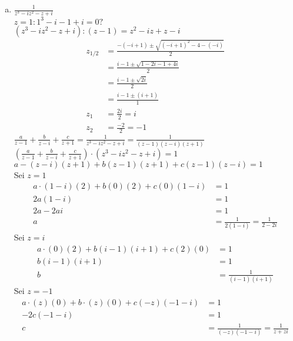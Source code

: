 \documentclass[11pt,a4paper]{article}
\begin{document}
    \begin{enumerate}[a)]
      \item $\frac{1}{z^3-iz^2-z+i}$\\
      $z=1:1^3-i-1+i=0?$\\
      $\left(z^3-iz^2-z+i\right):\left(z-1\right)=z^2-iz+z-i$
      \begin{align*}
        z_{1/2}&=\frac{-\left(-i+1\right)\pm\sqrt{\left(-i+1\right)^2-4-\left(-i\right)}}{2}\\
        &=\frac{i-1\pm\sqrt{1-2i-1+4i}}{2}\\
        &=\frac{i-1\pm\sqrt{2i}}{2}\\
        &=\frac{i-1\pm\left(i+1\right)}{1}\\
        z_1&=\frac{2i}{2}=i\\
        z_2&=\frac{-2}{2}=-1
      \end{align*}
      $\frac{a}{z-1}+\frac{b}{z-i}+\frac{c}{z+1}=\frac{1}{z^3-iz^2-z+i}=\frac{1}{\left(z-1\right)\left(z-i\right)\left(z+1\right)}$\\
      $\left(\frac{a}{z-1}+\frac{b}{z-i}+\frac{c}{z+1}\right)\cdot\left(z^3-iz^2-z+i\right)=1$\\
      $a-\left(z-i\right)\left(z+1\right)+b\left(z-1\right)\left(z+1\right)+c\left(z-1\right)\left(z-i\right)=1$\\
      Sei $z=1$
      \begin{align*}
        a\cdot\left(1-i\right)\left(2\right)+b\left(0\right)\left(2\right)+c\left(0\right)\left(1-i\right)&=1\\
        2a\left(1-i\right)&=1\\
        2a-2ai&=1\\
        a&=\frac{1}{2\left(1-i\right)}=\frac{1}{2-2i}
      \end{align*}
      Sei $z=i$
      \begin{align*}
        a\cdot\left(0\right)\left(2\right)+b\left(i-1\right)\left(i+1\right)+c\left(2\right)\left(0\right)&=1\\
        b\left(i-1\right)\left(i+1\right)&=1\\
        b&=\frac{1}{\left(i-1\right)\left(i+1\right)}
      \end{align*}
      Sei $z=-1$
      \begin{align*}
        a\cdot\left(z\right)\left(0\right)+b\cdot\left(z\right)\left(0\right)+c\left(-z\right)\left(-1-i\right)&=1\\
        -2c\left(-1-i\right)&=1\\
        c&=\frac{1}{\left(-z\right)\left(-1-i\right)}=\frac{1}{z+zi}\\

\end{align*}
\end{enumerate}
\end{document}
